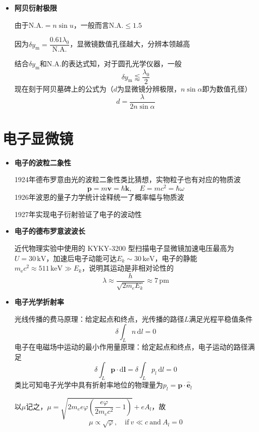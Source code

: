 \documentclass[10pt]{beamer}
\renewcommand{\bm}{\symbf}
\newenvironment{slide}{
    \begin{frame}{\bfseries{\sectiontitle}}
}{
    \end{frame}
}
\let\sectiononly\section
\renewcommand{\section}[1]{
    \sectiononly{#1}
    \let\sectiontitle\relax
    \newcommand{\sectiontitle}{#1}
}
\begin{document}
\begin{slide}
    \begin{itemize}
    \item \textbf{阿贝衍射极限}

    由于$\mathrm{N.A.} = n\sin u$，一般而言$\mathrm{N.A.} \leq 1.5$

    因为$\delta y_{\mathrm{m}}=\dfrac{0.61\lambda_0}{\mathrm{N.A.}}$，显微镜数值孔径越大，分辨本领越高

    结合$\delta y_{\mathrm{m}}$和$\mathrm{N.A.}$的表达式知，对于圆孔光学仪器，一般
    \[
        \boxed{\delta y_{\mathrm{m}} \lessapprox \frac{\lambda_0}{2}}
    \]
    现在刻于阿贝墓碑上的公式为（$d$为显微镜分辨极限，$n\sin\alpha$即为数值孔径）
    \[
        \boxed{d = \frac{\lambda}{2n\sin\alpha}}
    \]
    \end{itemize}
\end{slide}

\section{电子显微镜}

\begin{slide}
    \begin{itemize}
    \item \textbf{电子的波粒二象性}

    1924年德布罗意由光的波粒二象性类比猜想，实物粒子也有对应的物质波
    \[
        \bm p = m\bm v = \hbar\bm k,\quad E = mc^2 = \hbar\omega
    \]
    1926年波恩的量子力学统计诠释统一了概率幅与物质波

    1927年实现电子衍射验证了电子的波动性

    \item \textbf{电子的德布罗意波波长}

    近代物理实验中使用的 KYKY-3200 型扫描电子显微镜加速电压最高为$U = 30\,\mathrm{kV}$，加速后电子动能可达$E_k\sim30\,\mathrm{keV}$，电子的静能$m_{\mathrm{e}}c^2 \approx 511\,\mathrm{keV}\gg E_k$，说明其运动是非相对论性的
    \[
        \lambda \approx \frac{h}{\sqrt{2m_e E_k}} \approx 7\,\mathrm{pm}
    \]
    \end{itemize}
\end{slide}

\begin{slide}
    \begin{itemize}
    \item \textbf{电子光学折射率}

    光线传播的费马原理：给定起点和终点，光传播的路径$L$满足光程平稳值条件
    \[
        \delta\int_{L} n\,\mathrm{d}l = 0
    \]
    电子在电磁场中运动的最小作用量原理：给定起点和终点，电子运动的路径满足
    \[
    \delta\int_{L} \bm{p} \cdot \mathrm{d}\bm{l} = \delta\int_{L} p_l\,\mathrm{d}l = 0
    \]
    类比可知电子光学中具有折射率地位的物理量为$p_l=\bm{p}\cdot\hat{\bm{e}}_l$

    以$\mu$记之，$\mu=\sqrt{2m_e e\varphi\left(\dfrac{e\varphi}{2m_e c^2}-1\right)}+eA_l$，故
    \[
        \boxed{\mu \propto \sqrt{\varphi},\quad \text{if}\ v \ll c\ \text{and}\ A_l = 0}
    \]
    \end{itemize}
\end{slide}
\end{document}
